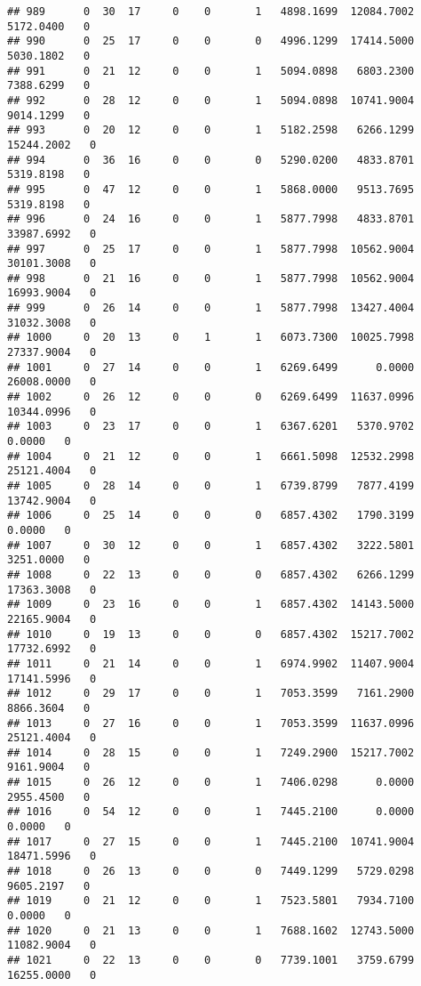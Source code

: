 \documentclass[
]{article}
\begin{document}
\begin{enumerate}
\begin{verbatim}
## 989      0  30  17     0    0       1   4898.1699  12084.7002   5172.0400   0
## 990      0  25  17     0    0       0   4996.1299  17414.5000   5030.1802   0
## 991      0  21  12     0    0       1   5094.0898   6803.2300   7388.6299   0
## 992      0  28  12     0    0       1   5094.0898  10741.9004   9014.1299   0
## 993      0  20  12     0    0       1   5182.2598   6266.1299  15244.2002   0
## 994      0  36  16     0    0       0   5290.0200   4833.8701   5319.8198   0
## 995      0  47  12     0    0       1   5868.0000   9513.7695   5319.8198   0
## 996      0  24  16     0    0       1   5877.7998   4833.8701  33987.6992   0
## 997      0  25  17     0    0       1   5877.7998  10562.9004  30101.3008   0
## 998      0  21  16     0    0       1   5877.7998  10562.9004  16993.9004   0
## 999      0  26  14     0    0       1   5877.7998  13427.4004  31032.3008   0
## 1000     0  20  13     0    1       1   6073.7300  10025.7998  27337.9004   0
## 1001     0  27  14     0    0       1   6269.6499      0.0000  26008.0000   0
## 1002     0  26  12     0    0       0   6269.6499  11637.0996  10344.0996   0
## 1003     0  23  17     0    0       1   6367.6201   5370.9702      0.0000   0
## 1004     0  21  12     0    0       1   6661.5098  12532.2998  25121.4004   0
## 1005     0  28  14     0    0       1   6739.8799   7877.4199  13742.9004   0
## 1006     0  25  14     0    0       0   6857.4302   1790.3199      0.0000   0
## 1007     0  30  12     0    0       1   6857.4302   3222.5801   3251.0000   0
## 1008     0  22  13     0    0       0   6857.4302   6266.1299  17363.3008   0
## 1009     0  23  16     0    0       1   6857.4302  14143.5000  22165.9004   0
## 1010     0  19  13     0    0       0   6857.4302  15217.7002  17732.6992   0
## 1011     0  21  14     0    0       1   6974.9902  11407.9004  17141.5996   0
## 1012     0  29  17     0    0       1   7053.3599   7161.2900   8866.3604   0
## 1013     0  27  16     0    0       1   7053.3599  11637.0996  25121.4004   0
## 1014     0  28  15     0    0       1   7249.2900  15217.7002   9161.9004   0
## 1015     0  26  12     0    0       1   7406.0298      0.0000   2955.4500   0
## 1016     0  54  12     0    0       1   7445.2100      0.0000      0.0000   0
## 1017     0  27  15     0    0       1   7445.2100  10741.9004  18471.5996   0
## 1018     0  26  13     0    0       0   7449.1299   5729.0298   9605.2197   0
## 1019     0  21  12     0    0       1   7523.5801   7934.7100      0.0000   0
## 1020     0  21  13     0    0       1   7688.1602  12743.5000  11082.9004   0
## 1021     0  22  13     0    0       0   7739.1001   3759.6799  16255.0000   0

\end{verbatim}
\end{enumerate}
\end{document}
